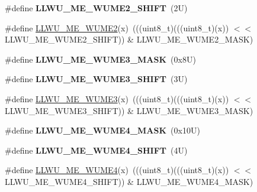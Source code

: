\begin{DoxyCompactItemize}
\#define {\bfseries L\+L\+W\+U\+\_\+\+M\+E\+\_\+\+W\+U\+M\+E2\+\_\+\+S\+H\+I\+FT}~(2\+U)
\item 
\#define \mbox{\hyperlink{group___l_l_w_u___register___masks_gaad5f38620081713700faa574d4756037}{L\+L\+W\+U\+\_\+\+M\+E\+\_\+\+W\+U\+M\+E2}}(x)~(((uint8\+\_\+t)(((uint8\+\_\+t)(x)) $<$$<$ L\+L\+W\+U\+\_\+\+M\+E\+\_\+\+W\+U\+M\+E2\+\_\+\+S\+H\+I\+FT)) \& L\+L\+W\+U\+\_\+\+M\+E\+\_\+\+W\+U\+M\+E2\+\_\+\+M\+A\+SK)
\item 
\mbox{\label{group___l_l_w_u___register___masks_ga6f6ea286130568de4df073a50fbdc282}} 
\#define {\bfseries L\+L\+W\+U\+\_\+\+M\+E\+\_\+\+W\+U\+M\+E3\+\_\+\+M\+A\+SK}~(0x8\+U)
\item 
\mbox{\label{group___l_l_w_u___register___masks_ga394f6049d44881fafbc58b62e3ea8f44}} 
\#define {\bfseries L\+L\+W\+U\+\_\+\+M\+E\+\_\+\+W\+U\+M\+E3\+\_\+\+S\+H\+I\+FT}~(3\+U)
\item 
\#define \mbox{\hyperlink{group___l_l_w_u___register___masks_gafd25630d6da4e8bd90c95a1b534bfe26}{L\+L\+W\+U\+\_\+\+M\+E\+\_\+\+W\+U\+M\+E3}}(x)~(((uint8\+\_\+t)(((uint8\+\_\+t)(x)) $<$$<$ L\+L\+W\+U\+\_\+\+M\+E\+\_\+\+W\+U\+M\+E3\+\_\+\+S\+H\+I\+FT)) \& L\+L\+W\+U\+\_\+\+M\+E\+\_\+\+W\+U\+M\+E3\+\_\+\+M\+A\+SK)
\item 
\mbox{\label{group___l_l_w_u___register___masks_ga4b7fa4566d64069e93d5bf9bf69efcf4}} 
\#define {\bfseries L\+L\+W\+U\+\_\+\+M\+E\+\_\+\+W\+U\+M\+E4\+\_\+\+M\+A\+SK}~(0x10\+U)
\item 
\mbox{\label{group___l_l_w_u___register___masks_gad162d87bd892f7bfcd34c74941168e64}} 
\#define {\bfseries L\+L\+W\+U\+\_\+\+M\+E\+\_\+\+W\+U\+M\+E4\+\_\+\+S\+H\+I\+FT}~(4\+U)
\item 
\#define \mbox{\hyperlink{group___l_l_w_u___register___masks_ga4f426ee3d4121039991f556746934a66}{L\+L\+W\+U\+\_\+\+M\+E\+\_\+\+W\+U\+M\+E4}}(x)~(((uint8\+\_\+t)(((uint8\+\_\+t)(x)) $<$$<$ L\+L\+W\+U\+\_\+\+M\+E\+\_\+\+W\+U\+M\+E4\+\_\+\+S\+H\+I\+FT)) \& L\+L\+W\+U\+\_\+\+M\+E\+\_\+\+W\+U\+M\+E4\+\_\+\+M\+A\+SK)
\item 
\mbox{\label{group___l_l_w_u___register___masks_gadeab309cd88e84e94433398ea4656511}} 
$$
\end{DoxyCompactItemize}
